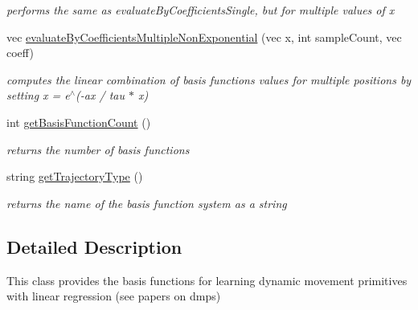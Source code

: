 \begin{DoxyCompactItemize}
\begin{DoxyCompactList}\small\item\em performs the same as evaluate\-By\-Coefficients\-Single, but for multiple values of x \end{DoxyCompactList}\item 
vec \hyperlink{classDMPTrajectoryGenerator_a1e926f56eea491b06303b682c16aa0bd}{evaluate\-By\-Coefficients\-Multiple\-Non\-Exponential} (vec x, int sample\-Count, vec coeff)
\begin{DoxyCompactList}\small\item\em computes the linear combination of basis functions values for multiple positions by setting x = e$^\wedge$(-\/ax / tau $\ast$ x) \end{DoxyCompactList}\item 
int \hyperlink{classDMPTrajectoryGenerator_add61de058ac17ce262236066a22bb2d6}{get\-Basis\-Function\-Count} ()
\begin{DoxyCompactList}\small\item\em returns the number of basis functions \end{DoxyCompactList}\item 
string \hyperlink{classDMPTrajectoryGenerator_a69dffc9351054b936ddb9285b4065b3d}{get\-Trajectory\-Type} ()
\begin{DoxyCompactList}\small\item\em returns the name of the basis function system as a string \end{DoxyCompactList}\end{DoxyCompactItemize}


\subsection{\-Detailed \-Description}
\-This class provides the basis functions for learning dynamic movement primitives with linear regression (see papers on dmps) 

